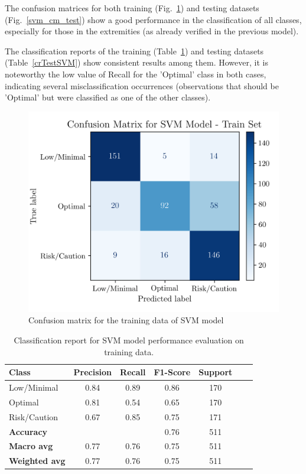\documentclass[conference]{IEEEtran}
\begin{document}
The confusion matrices for both training (Fig.~\ref{svm_cm_train}) and testing datasets (Fig.~\ref{svm_cm_test}) show a good performance in the classification of all classes, especially for those in the extremities (as already verified in the previous model).

The classification reports of the training (Table~\ref{crTrainSVM}) and testing datasets (Table~\ref{crTestSVM}) show consistent results among them. However, it is noteworthy the low value of Recall for the 'Optimal' class in both cases, indicating several misclassification occurrences (observations that should be 'Optimal' but were classified as one of the other classes). 

\begin{figure}[H]
    \centering
    \includegraphics[width=1\linewidth]{assets/SVM_ConfusionMatrixTrain.png}
    \caption{Confusion matrix for the training data of SVM model}
    \label{svm_cm_train}
\end{figure} %

\begin{table}[H]
\centering
\caption{Classification report for SVM model performance evaluation on training data.}
\label{crTrainSVM}
\begin{tabular}{lcccccc}
\toprule
\textbf{Class} & \textbf{Precision} & \textbf{Recall} & \textbf{F1-Score} & \textbf{Support} \\
\midrule
Low/Minimal & 0.84 & 0.89 & 0.86 & 170 \\
Optimal & 0.81 & 0.54 & 0.65 & 170 \\
Risk/Caution & 0.67 & 0.85 & 0.75 & 171 \\
\midrule
\textbf{Accuracy} &  &  & 0.76 & 511 \\
\textbf{Macro avg} & 0.77 & 0.76 & 0.75 & 511 \\
\textbf{Weighted avg} & 0.77 & 0.76 & 0.75 & 511 \\
\bottomrule
\end{tabular}
\end{table} %
\end{document}
